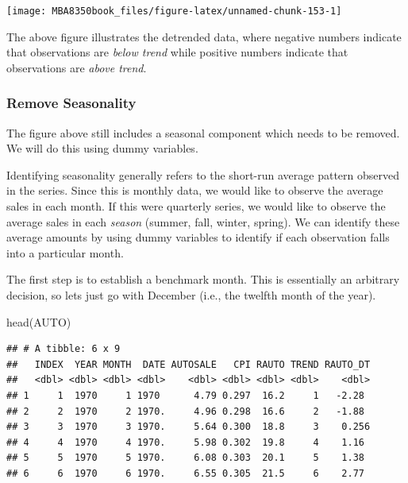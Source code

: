 \documentclass[
]{book}
\newenvironment{Shaded}{\begin{snugshade}}{\end{snugshade}}
\newcommand{\FunctionTok}[1]{\textcolor[rgb]{0.00,0.00,0.00}{#1}}
\newcommand{\NormalTok}[1]{#1}
\begin{document}
\begin{center}\texttt{[image: MBA8350book\_files/figure-latex/unnamed-chunk-153-1]} \end{center}

The above figure illustrates the detrended data, where negative numbers indicate that observations are \emph{below trend} while positive numbers indicate that observations are \emph{above trend}.

\hypertarget{remove-seasonality}{%
\subsubsection*{Remove Seasonality}\label{remove-seasonality}}

The figure above still includes a seasonal component which needs to be removed. We will do this using dummy variables.

Identifying seasonality generally refers to the short-run average pattern observed in the series. Since this is monthly data, we would like to observe the average sales in each month. If this were quarterly series, we would like to observe the average sales in each \emph{season} (summer, fall, winter, spring). We can identify these average amounts by using dummy variables to identify if each observation falls into a particular month.

The first step is to establish a benchmark month. This is essentially an arbitrary decision, so lets just go with December (i.e., the twelfth month of the year).

\begin{Shaded}
\begin{Highlighting}[]
\FunctionTok{head}\NormalTok{(AUTO)}
\end{Highlighting}
\end{Shaded}

\begin{verbatim}
## # A tibble: 6 x 9
##   INDEX  YEAR MONTH  DATE AUTOSALE   CPI RAUTO TREND RAUTO_DT
##   <dbl> <dbl> <dbl> <dbl>    <dbl> <dbl> <dbl> <dbl>    <dbl>
## 1     1  1970     1 1970      4.79 0.297  16.2     1   -2.28 
## 2     2  1970     2 1970.     4.96 0.298  16.6     2   -1.88 
## 3     3  1970     3 1970.     5.64 0.300  18.8     3    0.256
## 4     4  1970     4 1970.     5.98 0.302  19.8     4    1.16 
## 5     5  1970     5 1970.     6.08 0.303  20.1     5    1.38 
## 6     6  1970     6 1970.     6.55 0.305  21.5     6    2.77
\end{verbatim}
\end{document}
